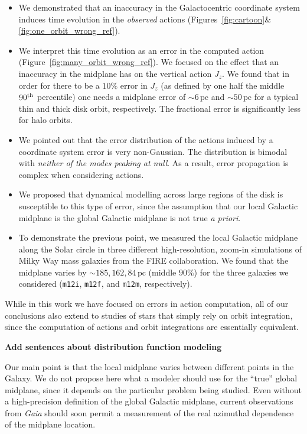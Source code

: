 \documentclass[twocolumn]{aastex62}
\newcommand{\pc}{\text{pc}}
\newcommand{\mi}{\texttt{m12i}}
\newcommand{\mf}{\texttt{m12f}}
\newcommand{\mm}{\texttt{m12m}}
\newcommand{\uth}{\textsuperscript{th}}
\begin{document}
\begin{itemize}
\item We demonstrated that an inaccuracy in the Galactocentric coordinate
system induces time evolution in the {\em observed} actions
(Figures~\ref{fig:cartoon}\&\ref{fig:one_orbit_wrong_ref}). 

\item We interpret this time evolution as an error in the computed action
(Figure~\ref{fig:many_orbit_wrong_ref}). We focused on the effect that an
inaccuracy in the midplane has on the vertical action $J_z$. We found that in
order for there to be a $10\%$ error in $J_z$ (as defined by one half the middle
$90\uth$ percentile) one needs a midplane error of $\sim6\,\pc$ and
$\sim50\,\pc$ for a typical thin and thick disk orbit, respectively. The
fractional error is significantly less for halo orbits.

\item We pointed out that the error distribution of the actions induced by a
coordinate system error is very non-Gaussian. The distribution is bimodal with
{\em neither of the modes peaking at 
     null}. 
As a result, error
propagation is 
     complex
when considering actions.

\item We proposed that dynamical modelling across large regions of the disk is
susceptible to this type of error, since the assumption that our local
Galactic midplane is the global Galactic midplane is not true {\em a priori}.

\item To demonstrate the previous point, we measured the local Galactic
midplane along the Solar circle in three different high-resolution, zoom-in
simulations of Milky Way mass galaxies from the FIRE collaboration. We found
that the midplane varies by $\sim185, 162, 84\,\pc$ (middle $90\%$) for the
three galaxies we considered (\mi{}, \mf{}, and \mm{}, respectively).

\end{itemize}

While in this work we have focused on errors in action computation, all of our
conclusions also extend to studies of stars that simply rely on orbit
integration, since the computation of actions and orbit integrations are
essentially equivalent.

{\bf Add sentences about distribution function modeling}

Our main point is that the local midplane varies between different points in
the Galaxy. We do
not propose here what a modeler should use for the ``true'' global midplane,
since it depends on the particular problem being studied. Even without a
high-precision definition of the global Galactic midplane, current
observations from {\em Gaia} should soon permit a measurement of the real
azimuthal dependence of the midplane location.
\end{document}
